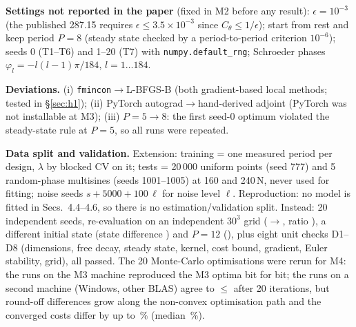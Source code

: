 \documentclass[10pt,a4paper,twocolumn]{article}
\begin{document}
\textbf{Settings not reported in the paper} (fixed in M2 before any result):
$\epsilon=10^{-3}$ (the published 287.15 requires $\epsilon\le3.5\times10^{-3}$ since $C_\theta\le1/\epsilon$);
start from rest and keep period $P=8$ (steady state checked by a period-to-period criterion $10^{-6}$);
seeds 0 (T1--T6) and 1--20 (T7) with \texttt{numpy.default\_rng}; Schroeder phases
$\varphi_l=-l(l-1)\pi/184$, $l=1\ldots184$.

\textbf{Deviations.} (i) \texttt{fmincon}$\to$L-BFGS-B (both gradient-based local methods; tested in
\S\ref{sec:h1}); (ii) PyTorch autograd$\to$hand-derived adjoint (PyTorch was not installable at M3);
(iii) $P=5\to8$: the first seed-0 optimum violated the steady-state rule at $P=5$, so all runs were repeated.

\textbf{Data split and validation.} Extension: training = one measured period per design, $\lambda$ by blocked
CV on it; tests = 20\,000 uniform points (seed 777) and 5 random-phase multisines (seeds 1001--1005) at 160 and
240\,N, never used for fitting; noise seeds $s+5000+100\,\ell$ for noise level $\ell$. Reproduction: no model is fitted in Secs.~4.4--4.6, so there is no estimation/validation split.
Instead: 20 independent seeds, re-evaluation on an independent $30^3$ grid
(\nGridInit$\to$\nGridOpt, ratio \nGridRatio), a different initial state (state difference
\nXzeroOpt) and $P=12$ (\nPtenOpt), plus eight unit checks D1--D8 (dimensions, free decay, steady state,
kernel, cost bound, gradient, Euler stability, grid), all passed. The 20 Monte-Carlo optimisations were rerun for M4:
the \mRerunIdentical{} runs on the M3 machine reproduced the M3 optima bit for bit; the runs on a second
machine (Windows, other BLAS) agree to $\le$\mRerunItTwentyMax{} after 20 iterations, but round-off
differences grow along the non-convex optimisation path and the converged costs differ by up to
\mRerunFinalMax\,\% (median \mRerunFinalMed\,\%).
\end{document}
